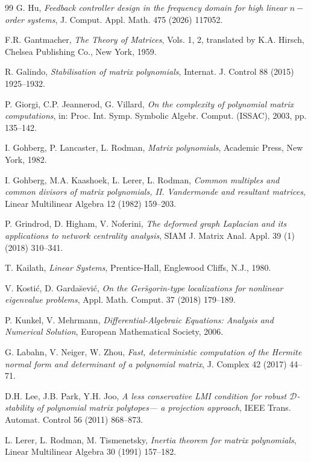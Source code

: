 \documentclass[12pt,reqno]{amsart}
\theoremstyle{plain}
\numberwithin{equation}{section}
\theoremstyle{remark}
\begin{document}
\begin{thebibliography}{99}
 G. Hu, \textit{Feedback controller design in the frequency domain for high linear}
$n-$\textit{ order systems}, J. Comput. Appl. Math. 475 (2026) 117052.

 F.R. Gantmacher, \textit{The Theory of Matrices}, Vols. 1, 2, translated by K.A. Hirsch, Chelsea Publishing Co., New York, 1959.

 R. Galindo, \textit{Stabilisation of matrix polynomials}, Internat. J.
    Control
88 (2015) 1925--1932.

 P. Giorgi, C.P. Jeannerod, G. Villard, \textit{On the complexity of polynomial matrix computations}, in: Proc. Int. Symp. Symbolic Algebr. Comput. (ISSAC), 2003, pp. 135--142.


 I. Gohberg, P. Lancaster, L. Rodman, \textit{Matrix polynomials}, Academic Press, New York, 1982.

I. Gohberg, M.A. Kaashoek, L. Lerer, L. Rodman, \textit{Common multiples and common divisors of matrix polynomials, II. Vandermonde and resultant matrices}, Linear Multilinear Algebra 12 (1982) 159--203.

 P. Grindrod, D. Higham, V. Noferini, \textit{The deformed graph Laplacian and its applications to network centrality analysis}, SIAM J. Matrix Anal. Appl. 39 (1) (2018) 310--341.

 T. Kailath, \textit{Linear Systems}, Prentice-Hall, Englewood Cliffs, N.J., 1980.

V. Kosti\'c, D. Garda\u{s}evi\'c, \textit{On the Ger\u{s}gorin-type localizations for nonlinear eigenvalue problems}, Appl. Math. Comput. 37 (2018) 179--189.

 P. Kunkel, V. Mehrmann, \textit{Differential-Algebraic Equations: Analysis and Numerical Solution}, European Mathematical Society, 2006.

 G. Labahn, V. Neiger, W. Zhou, \textit{Fast, deterministic computation of the
Hermite normal form and determinant of a
polynomial matrix}, J. Complex 42 (2017) 44--71.

 D.H. Lee, J.B. Park, Y.H. Joo,
    \textit{A less conservative LMI condition for robust $\mathcal D$-stability of polynomial matrix
        polytopes--- a projection approach}, IEEE Trans. Automat. Control 56 (2011) 868--873.



 L. Lerer, L. Rodman,  M. Tismenetsky, \textit{Inertia theorem for matrix polynomials}, Linear Multilinear Algebra 30 (1991) 157--182.





\end{thebibliography}
\end{document}
